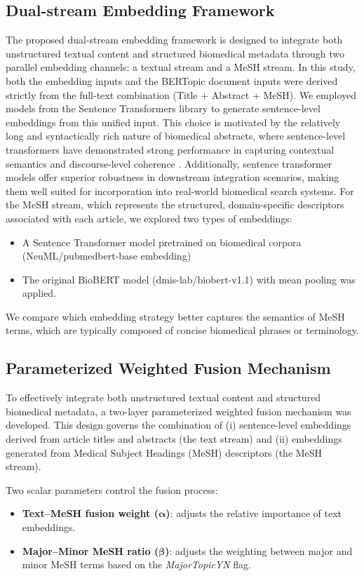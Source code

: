 \documentclass[utf8]{FrontiersinHarvard}
\begin{document}
\subsection{Dual-stream Embedding Framework}
The proposed dual-stream embedding framework is designed to integrate both unstructured textual content and structured biomedical metadata through two parallel embedding channels: a textual stream and a MeSH stream.
In this study, both the embedding inputs and the BERTopic document inputs were derived strictly from the full-text combination (Title + Abstract + MeSH). We employed models from the Sentence Transformers library to generate sentence-level embeddings from this unified input. This choice is motivated by the relatively long and syntactically rich nature of biomedical abstracts, where sentence-level transformers have demonstrated strong performance in capturing contextual semantics and discourse-level coherence \citep{reimers_sentence-bert_2019}. Additionally, sentence transformer models offer superior robustness in downstream integration scenarios, making them well suited for incorporation into real-world biomedical search systems.
For the MeSH stream, which represents the structured, domain-specific descriptors associated with each article, we explored two types of embeddings:
\begin{itemize}
    \item A Sentence Transformer model pretrained on biomedical corpora (NeuML/pubmedbert-base embedding)
    \item The original BioBERT model (dmis-lab/biobert-v1.1) with mean pooling was applied.
\end{itemize}
We compare which embedding strategy better captures the semantics of MeSH terms, which are typically composed of concise biomedical phrases or terminology.

\subsection{Parameterized Weighted Fusion Mechanism}
To effectively integrate both unstructured textual content and structured biomedical metadata,
a two-layer parameterized weighted fusion mechanism was developed.
This design governs the combination of
(i) sentence-level embeddings derived from article titles and abstracts (the text stream) and
(ii) embeddings generated from Medical Subject Headings (MeSH) descriptors (the MeSH stream).

Two scalar parameters control the fusion process:
\begin{itemize}
    \item \textbf{Text–MeSH fusion weight ($\boldsymbol{\alpha}$)}: adjusts the relative importance of text embeddings.
    \item \textbf{Major–Minor MeSH ratio ($\boldsymbol{\beta}$)}: adjusts the weighting between major and minor MeSH terms based on the \textit{MajorTopicYN} flag.
\end{itemize}
\end{document}
